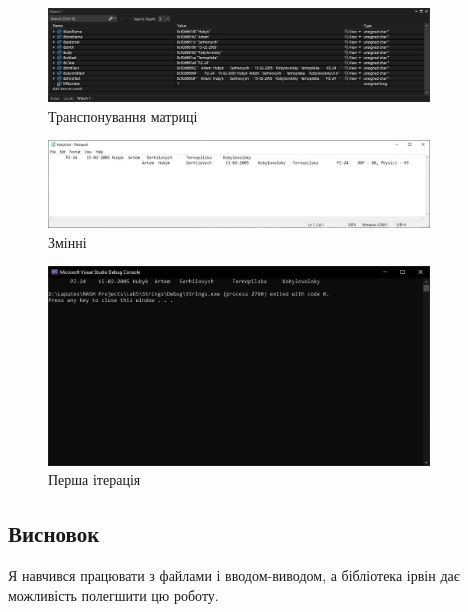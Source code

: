 \documentclass[12pt]{extarticle}
\begin{document}
\vspace{12pt}
\begin{figure}[H]
    \centering
    \includegraphics[width=0.90\textwidth]{var.jpg}
    \caption{Транспонування матриці}
\end{figure}
\begin{figure}[H]
    \centering
    \includegraphics[width=0.90\textwidth]{file.jpg}
    \caption{Змінні}
\end{figure}

\begin{figure}[H]
    \centering
    \includegraphics[width=0.90\textwidth]{console.jpg}
    \caption{Перша ітерація}
\end{figure}

\vspace{12pt}

\subsection*{Висновок} 
Я навчився працювати з файлами і вводом-виводом, а
бібліотека ірвін дає можливість полегшити цю роботу.
\end{document}
